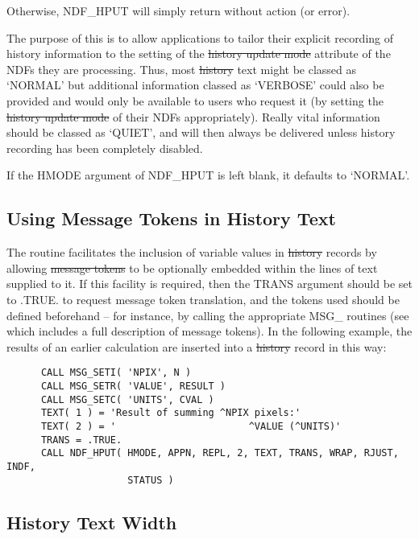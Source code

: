 Otherwise, NDF\_HPUT will simply return without action (or error).

The purpose of this is to allow applications to tailor their explicit
recording of history information to the setting of the \st{history
update mode\/} attribute of the NDFs they are processing.  Thus, most
\st{history\/} text might be classed as `NORMAL' but additional information
classed as `VERBOSE' could also be provided and would only be
available to users who request it (by setting the \st{history update
mode\/} of their NDFs appropriately).  Really vital information should
be classed as `QUIET', and will then always be delivered unless
history recording has been completely disabled.

If the HMODE argument of NDF\_HPUT is left blank, it defaults to
`NORMAL'.

\subsection{Using Message Tokens in History Text}

The  routine facilitates the inclusion of variable values in
\st{history\/} records by allowing \st{message tokens\/} to be optionally
embedded within the lines of text supplied to it. If this facility is
required, then the TRANS argument should be set to .TRUE. to request
message token translation, and the tokens used should be defined
beforehand -- for instance, by calling the appropriate MSG\_ routines
(see  which includes a full description of
message tokens). In the following example, the results of an earlier
calculation are inserted into a \st{history\/} record in this way:

\small
\begin{verbatim}
      CALL MSG_SETI( 'NPIX', N )
      CALL MSG_SETR( 'VALUE', RESULT )
      CALL MSG_SETC( 'UNITS', CVAL )
      TEXT( 1 ) = 'Result of summing ^NPIX pixels:'
      TEXT( 2 ) = '                       ^VALUE (^UNITS)'
      TRANS = .TRUE.
      CALL NDF_HPUT( HMODE, APPN, REPL, 2, TEXT, TRANS, WRAP, RJUST, INDF,
                     STATUS )
\end{verbatim}
\normalsize

\subsection{History Text Width}

